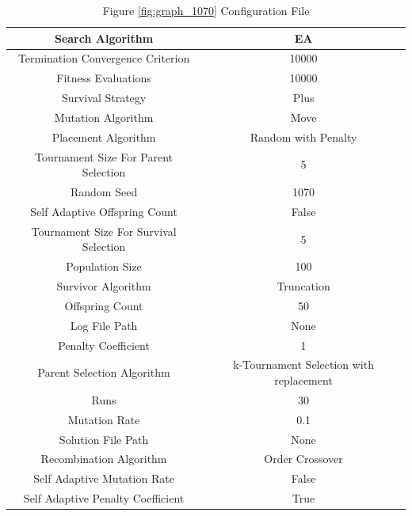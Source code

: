 \documentclass{standalone}
\begin{document}
\begin{table}[!htb]
	\centering
	\caption{Figure \ref{fig:graph_1070} Configuration File}
	\label{tab:graph_1070}
	\begin{tabular}{| c | c |}
		\hline
		Search Algorithm		& EA		 \\
		\hline
		Termination Convergence Criterion		& 10000		 \\
		\hline
		Fitness Evaluations		& 10000		 \\
		\hline
		Survival Strategy		& Plus		 \\
		\hline
		Mutation Algorithm		& Move		 \\
		\hline
		Placement Algorithm		& Random with Penalty		 \\
		\hline
		Tournament Size For Parent Selection		& 5		 \\
		\hline
		Random Seed		& 1070		 \\
		\hline
		Self Adaptive Offspring Count		& False		 \\
		\hline
		Tournament Size For Survival Selection		& 5		 \\
		\hline
		Population Size		& 100		 \\
		\hline
		Survivor Algorithm		& Truncation		 \\
		\hline
		Offspring Count		& 50		 \\
		\hline
		Log File Path		& None		 \\
		\hline
		Penalty Coefficient		& 1		 \\
		\hline
		Parent Selection Algorithm		& k-Tournament Selection with replacement		 \\
		\hline
		Runs		& 30		 \\
		\hline
		Mutation Rate		& 0.1		 \\
		\hline
		Solution File Path		& None		 \\
		\hline
		Recombination Algorithm		& Order Crossover		 \\
		\hline
		Self Adaptive Mutation Rate		& False		 \\
		\hline
		Self Adaptive Penalty Coefficient		& True		 \\
		\hline
	\end{tabular}
\end{table}
\end{document}

